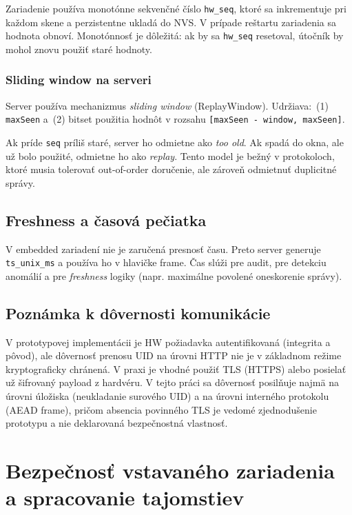 \documentclass[journal,a4paper,onecolumn]{IEEEtran}
\begin{document}
Zariadenie používa monotónne sekvenčné číslo \texttt{hw\_seq}, ktoré sa inkrementuje pri každom skene a perzistentne ukladá do NVS. V prípade reštartu zariadenia sa hodnota obnoví. Monotónnosť je dôležitá: ak by sa \texttt{hw\_seq} resetoval, útočník by mohol znovu použiť staré hodnoty.

\subsubsection{Sliding window na serveri}

Server používa mechanizmus \emph{sliding window} (ReplayWindow). Udržiava:\
(1) \texttt{maxSeen} a\
(2) bitset použitia hodnôt v rozsahu \texttt{[maxSeen - window, maxSeen]}.

Ak príde \texttt{seq} príliš staré, server ho odmietne ako \emph{too old}. Ak spadá do okna, ale už bolo použité, odmietne ho ako \emph{replay}. Tento model je bežný v protokoloch, ktoré musia tolerovať out-of-order doručenie, ale zároveň odmietnuť duplicitné správy.

\subsection{Freshness a časová pečiatka}

V embedded zariadení nie je zaručená presnosť času. Preto server generuje \texttt{ts\_unix\_ms} a používa ho v hlavičke frame. Čas slúži pre audit, pre detekciu anomálií a pre \emph{freshness} logiky (napr. maximálne povolené oneskorenie správy).

\subsection{Poznámka k dôvernosti komunikácie}

V prototypovej implementácii je HW požiadavka autentifikovaná (integrita a pôvod), ale dôvernosť prenosu UID na úrovni HTTP nie je v základnom režime kryptograficky chránená. V praxi je vhodné použiť TLS (HTTPS) alebo posielať už šifrovaný payload z hardvéru. V tejto práci sa dôvernosť posilňuje najmä na úrovni úložiska (neukladanie surového UID) a na úrovni interného protokolu (AEAD frame), pričom absencia povinného TLS je vedomé zjednodušenie prototypu a nie deklarovaná bezpečnostná vlastnosť.


\section{Bezpečnosť vstavaného zariadenia a spracovanie tajomstiev}
\end{document}
